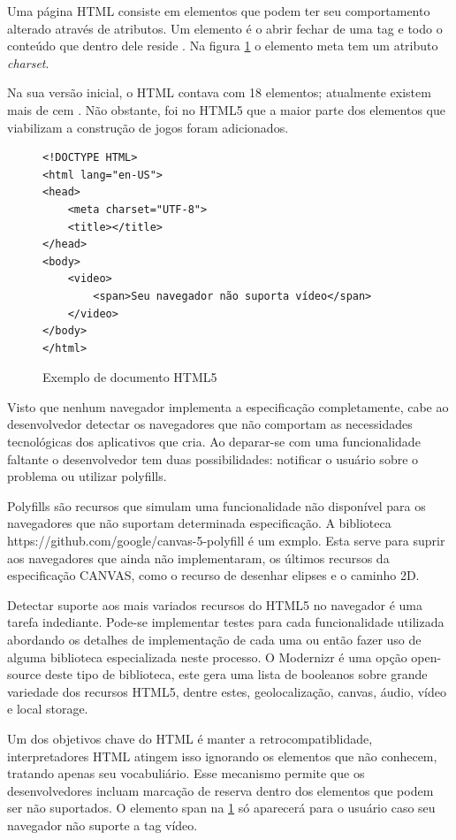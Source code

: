 \documentclass[
12pt,
a4paper,
portuges,
draft
]{report}
\begin{document}
Uma página HTML consiste em elementos que podem ter seu comportamento
alterado através de atributos. Um elemento é o abrir fechar de
uma tag e todo o conteúdo que dentro dele reside \autocite[pp.
10--11]{htmlAndCssDucket}. Na figura \ref{fig:htmlSample} o elemento
meta tem um atributo \textit{charset}.

Na sua versão inicial, o HTML contava com 18 elementos;
atualmente existem mais de cem \autocite{diveIntohtml}.
Não obstante, foi no HTML5 que a maior parte dos elementos
que viabilizam a construção de jogos foram adicionados.

\begin{figure}
\centering
\begin{verbatim}
<!DOCTYPE HTML>
<html lang="en-US">
<head>
	<meta charset="UTF-8">
	<title></title>
</head>
<body>
    <video>
        <span>Seu navegador não suporta vídeo</span>
    </video>
</body>
</html>
\end{verbatim}
\caption{Exemplo de documento HTML5}
\label{fig:htmlSample}
\end{figure}

Visto que nenhum navegador implementa a especificação completamente,
cabe ao desenvolvedor detectar os navegadores que não comportam as
necessidades tecnológicas dos aplicativos que cria. Ao deparar-se com uma funcionalidade
faltante o desenvolvedor tem duas possibilidades: notificar o usuário sobre o
problema ou utilizar polyfills.

Polyfills são recursos que simulam uma funcionalidade não disponível para
os navegadores que não suportam determinada especificação. A biblioteca
https://github.com/google/canvas-5-polyfill é um exmplo. Esta serve para
suprir aos navegadores que ainda não implementaram, os últimos recursos
da especificação CANVAS, como o recurso de desenhar elipses e o caminho 2D.

Detectar suporte aos mais variados recursos do HTML5 no navegador
é uma tarefa indediante. Pode-se implementar testes para
cada funcionalidade utilizada abordando os detalhes de implementação
de cada uma ou então fazer uso de alguma biblioteca especializada
neste processo. O Modernizr é uma opção open-source deste tipo de
biblioteca, este gera uma lista de booleanos sobre grande variedade dos
recursos HTML5, dentre estes, geolocalização, canvas, áudio, vídeo e
local storage.

Um dos objetivos chave do HTML é manter a retrocompatiblidade,
interpretadores HTML atingem isso ignorando os elementos que não conhecem, tratando apenas
seu vocabuliário. Esse mecanismo permite que os desenvolvedores incluam
marcação de reserva dentro dos elementos que podem ser não suportados.
O elemento span na \ref{fig:htmlSample} só aparecerá para o usuário caso seu
navegador não suporte a tag vídeo.
\end{document}

